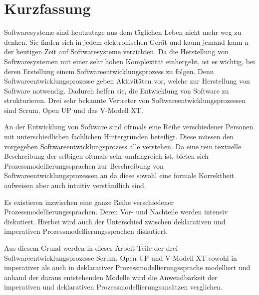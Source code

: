 \section*{Kurzfassung}

Softwaresysteme sind heutzutage aus dem täglichen Leben nicht mehr weg zu denken. Sie finden sich in jedem elektronischen Gerät und kaum jemand kann n der heutigen Zeit auf Softwaresysteme verzichten. Da die Herstellung von Softwaresystemen mit einer sehr hohen Komplexität einhergeht, ist es wichtig, 
bei deren Erstellung einem Softwareentwicklungsprozess zu folgen. Denn Softwareentwicklungsprozesse geben Aktivitäten vor, welche zur Herstellung von Software notwendig. Dadurch helfen sie, die Entwicklung von Software zu strukturieren. Drei sehr bekannte Vertreter von Softwareentwicklungsprozessen sind Scrum, Open UP und das V-Modell XT.\newline

An der Entwicklung von Software sind oftmals eine Reihe verschiedener Personen mit unterschiedlichen fachlichen Hintergründen beteiligt. Diese müssen den vorgegeben Softwareentwicklungsprozess alle verstehen. Da eine rein textuelle Beschreibung der selbigen oftmals sehr umfangreich ist, bieten sich Prozessmodellierungssprachen zur Beschreibung von Softwareentwicklungsprozessen an da diese sowohl eine formale Korrektheit aufweisen aber auch intuitiv verständlich sind.\newline

Es existieren inzwischen eine ganze Reihe verschiedener Prozessmodellierungssprachen. Deren Vor- und Nachteile werden intensiv diskutiert. Hierbei wird auch der Unterschied zwischen deklarativen und imperativen Prozessmodellierungssprachen diskutiert.\newline

Aus diesem Grund werden in dieser Arbeit Teile der drei Softwareentwicklungsprozesse Scrum, Open UP und V-Modell XT sowohl in imperativer als auch in deklarativer Prozessmodellierungssprache modelliert und anhand der daraus entstehenden Modelle wird die Anwendbarkeit der imperativen und deklarativen Prozessmodellierungsansätzen verglichen.



